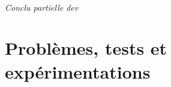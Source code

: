 \documentclass[
	headsepline=on,
	footsepline=on,
	twoside=off,
	abstract=on,
	DIV=10
]{scrreprt}
\begin{document}
		
		
		
		
		
		
		
		
		
		
		
		
		
		\paragraph{Conclu partielle dev}
	
	\part{Problèmes, tests et expérimentations}
	
\end{document}
